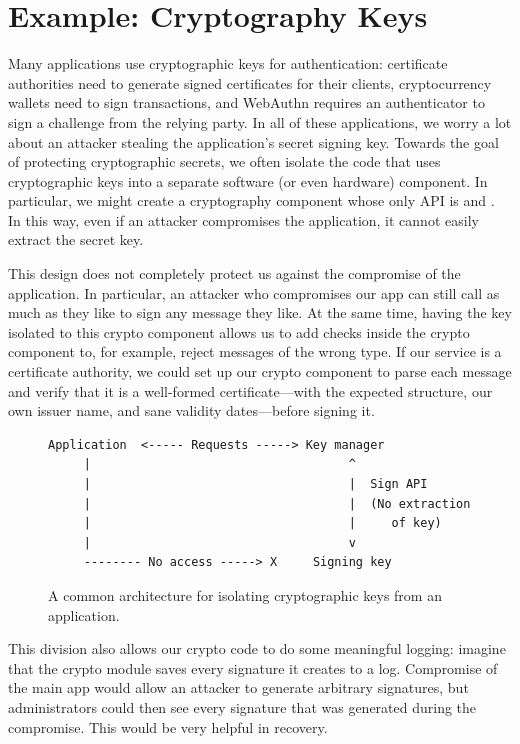 \section{Example: Cryptography Keys}
Many applications use cryptographic keys for authentication: certificate authorities need to generate signed certificates for their clients, cryptocurrency wallets need to sign transactions, and WebAuthn requires an authenticator to sign a challenge from the relying party. 
In all of these applications, we worry a lot about an attacker stealing the application's secret signing key.
Towards the goal of protecting cryptographic secrets, we often
isolate the code that uses cryptographic keys into a separate software (or even hardware)
component.
In particular, we might create a cryptography component whose 
only API is  and .
In this way, even if an attacker compromises the application, it cannot
easily extract the secret key.

This design does not completely protect us against the compromise of the application.
In particular, an attacker who compromises our app can still call  as much as they like to sign any message they like. 
At the same time, having the key isolated to this crypto component allows us to add checks inside the crypto component to, for example, reject messages of the wrong type. If our service is a certificate authority, we could set up our crypto component to parse each message and verify that it is a well-formed
certificate---with the expected structure, our own issuer name, and
sane validity dates---before signing it.

\begin{figure}
\begin{verbatim}
Application  <----- Requests -----> Key manager
     |                                    ^
     |                                    |  Sign API
     |                                    |  (No extraction 
     |                                    |     of key)
     |                                    v
     -------- No access -----> X     Signing key
\end{verbatim}
\caption{A common architecture for isolating cryptographic
keys from an application.}
\end{figure}
This division also allows our crypto code to do some meaningful logging: imagine that the crypto module saves every signature it creates to a log. Compromise of the main app would allow an attacker to generate arbitrary signatures, but administrators could then see every signature that was generated during the compromise. This would be very helpful in recovery.

